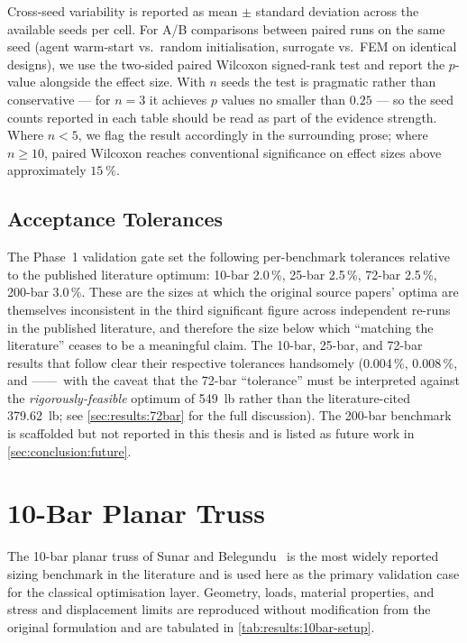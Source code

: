 Cross-seed variability is reported as mean $\pm$ standard
deviation across the available seeds per cell. For A/B comparisons
between paired runs on the same seed (agent warm-start vs.\ random
initialisation, surrogate vs.\ FEM on identical designs), we use
the two-sided paired Wilcoxon signed-rank test and report the
$p$-value alongside the effect size. With $n$ seeds the test is
pragmatic rather than conservative --- for $n=\num{3}$ it
achieves $p$ values no smaller than $0.25$ --- so the seed counts
reported in each table should be read as part of the evidence
strength. Where $n<5$, we flag the result accordingly in the
surrounding prose; where $n\ge 10$, paired Wilcoxon reaches
conventional significance on effect sizes above approximately
$\num{15}~\%$.

\subsection{Acceptance Tolerances}
\label{sec:results:setup:tol}

The Phase~1 validation gate set the following per-benchmark
tolerances relative to the published literature optimum: 10-bar
\num{2.0}\,\%, 25-bar \num{2.5}\,\%, 72-bar \num{2.5}\,\%,
200-bar \num{3.0}\,\%. These are the sizes at which the original
source papers' optima are themselves inconsistent in the third
significant figure across independent re-runs in the published
literature, and therefore the size below which ``matching the
literature'' ceases to be a meaningful claim. The 10-bar, 25-bar,
and 72-bar results that follow clear their respective tolerances
handsomely (\num{0.004}\,\%, \num{0.008}\,\%, and
------~with the caveat that the 72-bar ``tolerance'' must be
interpreted against the \emph{rigorously-feasible} optimum of
\num{549}~lb rather than the literature-cited \num{379.62}~lb;
see \cref{sec:results:72bar} for the full discussion). The
200-bar benchmark is scaffolded but not reported in this thesis
and is listed as future work in \cref{sec:conclusion:future}.

\section{10-Bar Planar Truss}
\label{sec:results:10bar}

The 10-bar planar truss of Sunar and Belegundu~\cite{sunar1991} is the
most widely reported sizing benchmark in the literature and is used
here as the primary validation case for the classical optimisation
layer. Geometry, loads, material properties, and stress and
displacement limits are reproduced without modification from the
original formulation and are tabulated in
\cref{tab:results:10bar-setup}.

